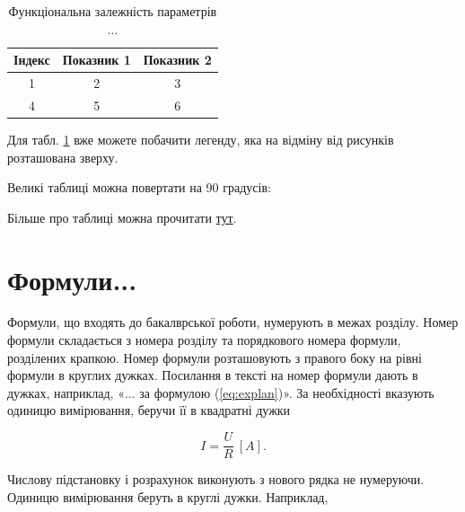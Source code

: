 \begin{table}[h]
	\caption{\label{table:2}Функціональна залежність параметрів ...}
	\begin{tabular}{|c|c|c|}
		\hline 
		Індекс & Показник 1 & Показник 2\tabularnewline
		\hline 
		\hline 
		1 & 2 & 3\tabularnewline
		\hline 
		4 & 5 & 6\tabularnewline
		\hline 
	\end{tabular}
\end{table}

Для табл. \ref{table:2} вже можете побачити легенду, яка на відміну від рисунків розташована зверху.

Великі таблиці можна повертати на 90 градусів:


Більше про таблиці можна прочитати \href{https://www.overleaf.com/learn/latex/Tables}{тут}.


\section{Формули...}

Формули, що входять до бакалврської роботи, нумерують в межах розділу. Номер формули складається з номера розділу та порядкового номера формули, розділених крапкою. Номер формули розташовують з правого боку на рівні формули в круглих дужках. По\-си\-лан\-ня в тексті на номер формули дають в дужках, наприклад, «... за формулою (\ref{eq:explan})». За необхідності вказують одиницю вимірювання, беручи її в квадратні дужки

\begin{equation}
\label{eq:explan}
I = \frac{U}{R}~[A].
\end{equation}

Числову підстановку і розрахунок виконують з нового рядка не нумеруючи. Одиницю вимірювання беруть в круглі дужки. Наприклад,

